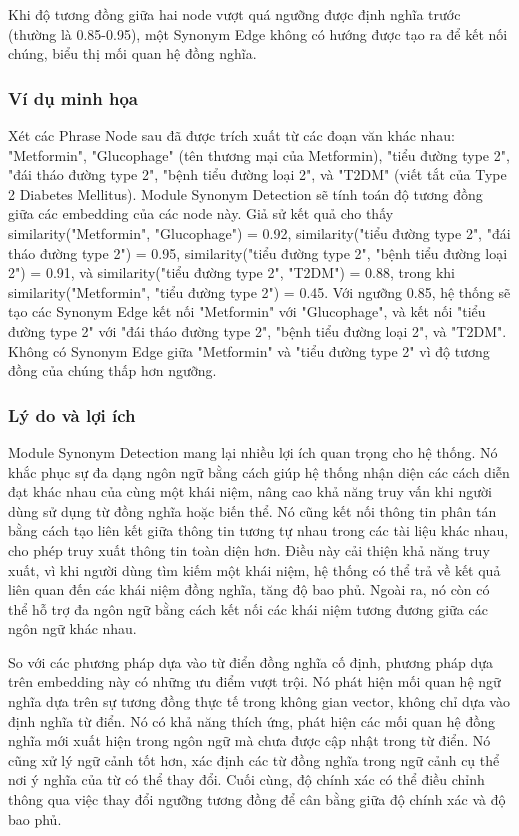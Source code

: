Khi độ tương đồng giữa hai node vượt quá ngưỡng được định nghĩa trước (thường là 0.85-0.95), một Synonym Edge không có hướng được tạo ra để kết nối chúng, biểu thị mối quan hệ đồng nghĩa.

\subsubsection{Ví dụ minh họa}
Xét các Phrase Node sau đã được trích xuất từ các đoạn văn khác nhau: "Metformin", "Glucophage" (tên thương mại của Metformin), "tiểu đường type 2", "đái tháo đường type 2", "bệnh tiểu đường loại 2", và "T2DM" (viết tắt của Type 2 Diabetes Mellitus). Module Synonym Detection sẽ tính toán độ tương đồng giữa các embedding của các node này. Giả sử kết quả cho thấy similarity("Metformin", "Glucophage") = 0.92, similarity("tiểu đường type 2", "đái tháo đường type 2") = 0.95, similarity("tiểu đường type 2", "bệnh tiểu đường loại 2") = 0.91, và similarity("tiểu đường type 2", "T2DM") = 0.88, trong khi similarity("Metformin", "tiểu đường type 2") = 0.45. Với ngưỡng 0.85, hệ thống sẽ tạo các Synonym Edge kết nối "Metformin" với "Glucophage", và kết nối "tiểu đường type 2" với "đái tháo đường type 2", "bệnh tiểu đường loại 2", và "T2DM". Không có Synonym Edge giữa "Metformin" và "tiểu đường type 2" vì độ tương đồng của chúng thấp hơn ngưỡng.

\subsubsection{Lý do và lợi ích}
Module Synonym Detection mang lại nhiều lợi ích quan trọng cho hệ thống. Nó khắc phục sự đa dạng ngôn ngữ bằng cách giúp hệ thống nhận diện các cách diễn đạt khác nhau của cùng một khái niệm, nâng cao khả năng truy vấn khi người dùng sử dụng từ đồng nghĩa hoặc biến thể. Nó cũng kết nối thông tin phân tán bằng cách tạo liên kết giữa thông tin tương tự nhau trong các tài liệu khác nhau, cho phép truy xuất thông tin toàn diện hơn. Điều này cải thiện khả năng truy xuất, vì khi người dùng tìm kiếm một khái niệm, hệ thống có thể trả về kết quả liên quan đến các khái niệm đồng nghĩa, tăng độ bao phủ. Ngoài ra, nó còn có thể hỗ trợ đa ngôn ngữ bằng cách kết nối các khái niệm tương đương giữa các ngôn ngữ khác nhau.

So với các phương pháp dựa vào từ điển đồng nghĩa cố định, phương pháp dựa trên embedding này có những ưu điểm vượt trội. Nó phát hiện mối quan hệ ngữ nghĩa dựa trên sự tương đồng thực tế trong không gian vector, không chỉ dựa vào định nghĩa từ điển. Nó có khả năng thích ứng, phát hiện các mối quan hệ đồng nghĩa mới xuất hiện trong ngôn ngữ mà chưa được cập nhật trong từ điển. Nó cũng xử lý ngữ cảnh tốt hơn, xác định các từ đồng nghĩa trong ngữ cảnh cụ thể nơi ý nghĩa của từ có thể thay đổi. Cuối cùng, độ chính xác có thể điều chỉnh thông qua việc thay đổi ngưỡng tương đồng để cân bằng giữa độ chính xác và độ bao phủ.


